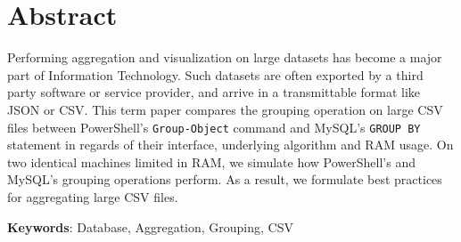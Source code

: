 \section*{Abstract}
Performing aggregation and visualization on large datasets has become a major part of Information Technology.
Such datasets are often exported by a third party software or service provider, and arrive in a transmittable
format like JSON or CSV.
This term paper compares the grouping operation on large CSV files between PowerShell's
\verb+Group-Object+ command and MySQL's \verb+GROUP BY+ statement in regards of
their interface, underlying algorithm and RAM usage. On two identical machines
limited in RAM, we simulate how PowerShell's and MySQL's grouping operations perform. As a result,
we formulate best practices for aggregating large CSV files.

\textbf{Keywords}: Database, Aggregation, Grouping, CSV